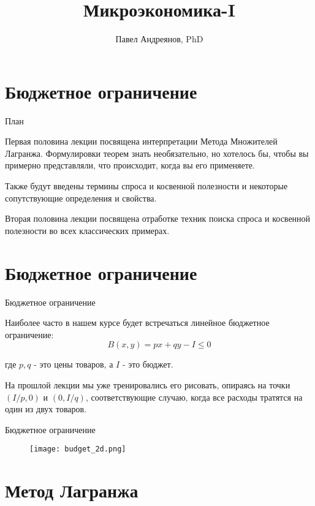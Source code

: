 \documentclass{beamer}
\title{
Микроэкономика-I
}
\author{
Павел Андреянов, PhD
}
\begin{document}
\maketitle

\section{Бюджетное ограничение}

\begin{frame}{План}

Первая половина лекции посвящена интерпретации Метода Множителей Лагранжа. Формулировки теорем знать необязательно, но хотелось бы, чтобы вы примерно представляли, что происходит, когда вы его применяете. 

Также будут введены термины спроса и косвенной полезности и некоторые сопутствующие определения и свойства.

Вторая половина лекции посвящена отработке техник поиска спроса и косвенной полезности во всех классических примерах.

\end{frame}


\section{Бюджетное ограничение}

\begin{frame}{Бюджетное ограничение}

Наиболее часто в нашем курсе будет встречаться линейное бюджетное ограничение:
$$ B(x,y) = p x + q y - I \leqslant 0$$

где $p, q$ - это цены товаров, а $I$ - это бюджет. 

На прошлой лекции мы уже тренировались его рисовать, опираясь на точки $(I/p, 0)$ и $(0, I/q)$, соответствующие случаю, когда все расходы тратятся на один из двух товаров.

\end{frame}

\begin{frame}{Бюджетное ограничение}

\begin{figure}[hbt]
\centering
\texttt{[image: budget\_2d.png]}
\end{figure}

\end{frame}

\section{Метод Лагранжа}
\end{document}
